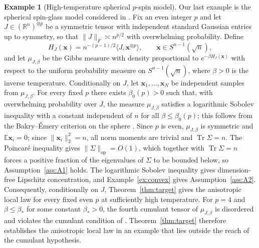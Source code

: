 \documentclass[11pt,reqno]{amsart}
\def\R{\mathbb{R}}
\def\x{\mathbf{x}}
\def\E{\mathbb{E}}
\def\op{\mathrm{op}}
\def\Tr{\operatorname{Tr}}
\theoremstyle{definition}
\newtheorem{example}[theorem]{Example}
\numberwithin{equation}{section}
\numberwithin{figure}{section}
\begin{document}
\begin{example}[High-temperature spherical $p$-spin model]\label{ex:spherical-p-spin} 
    Our last example is the spherical spin-glass model considered in \cite[Section~2.6]{fan2026anisotropic}. Fix an even integer $p$ and let $J\in(\R^n)^{\otimes p}$ be a symmetric tensor with independent standard Gaussian entries up to symmetry, so that $\|J\|_F\asymp n^{p/2}$ with overwhelming probability. Define
\begin{equation}\label{eq:p-spin}
 H_J(\x)=n^{-(p-1)/2}\langle J,\x^{\otimes p}\rangle,\qquad \x\in S^{n-1}(\sqrt n),
\end{equation}
and let $\mu_{J,\beta}$ be the Gibbs measure with density proportional to $e^{-\beta H_J(\x)}$ with respect to the uniform probability measure on $S^{n-1}(\sqrt n)$, where $\beta>0$ is the inverse temperature. Conditionally on $J$, let $\x_1,\ldots,\x_N$ be independent samples from $\mu_{J,\beta}$. For every fixed $p$ there exists $\beta_0(p)>0$ such that, with overwhelming probability over $J$, the measure $\mu_{J,\beta}$ satisfies a logarithmic Sobolev inequality with a constant independent of $n$ for all $\beta\le\beta_0(p)$; this follows from the Bakry--\'Emery criterion on the sphere \cite[Section~2.6]{fan2026anisotropic}. Since $p$ is even, $\mu_{J,\beta}$ is symmetric and $\E\x_i=0$; since $\|\x_i\|_2^2=n$, all norm moments are trivial and $\Tr\Sigma=n$. The Poincar\'e inequality gives $\|\Sigma\|_\op=O(1)$, which together with $\Tr\Sigma=n$ forces a positive fraction of the eigenvalues of $\Sigma$ to be bounded below, so Assumption~\ref{ass:A1} holds. The logarithmic Sobolev inequality gives dimension-free Lipschitz concentration, and Example~\ref{ex:convex} gives Assumption~\ref{ass:A2}. Consequently, conditionally on $J$, Theorem~\ref{thm:target} gives the anisotropic local law for every fixed even $p$ at sufficiently high temperature. For $p=4$ and $\beta\leq \beta_*$ for some constant $\beta_*>0$, the fourth cumulant tensor of $\mu_{J,\beta}$ is disordered and violates the cumulant condition of \cite{fan2026anisotropic}. Theorem~\ref{thm:target} therefore establishes the anisotropic local law in an example that lies outside the reach of the cumulant hypothesis.
\end{example}
\end{document}
